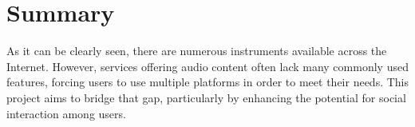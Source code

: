 \section*{Summary}
As it can be clearly seen, there are numerous instruments available across the Internet.
However, services offering audio content often lack many commonly used features,
forcing users to use multiple platforms in order to meet their needs. This project aims to bridge that gap,
particularly by enhancing the potential for social interaction among users.


